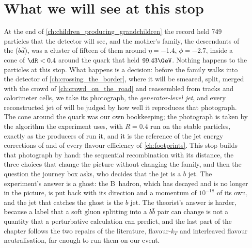 \section{What we will see at this stop}
\label{sec:family_photograph:what_we_compute}

At the end of \cref{ch:children_producing_grandchildren} the record held
749 particles that the detector will see, and the mother's family, the
descendants of the \Bbar ($b\bar d$), was a cluster of fifteen of them
around $\eta=-1.4$, $\phi=-2.7$, inside a cone of $\dR<0.4$ around the
quark that held $99.43\GeV$. Nothing happens to the particles at this
stop. What happens is a decision: before the family walks into the
detector of \cref{ch:crossing_the_border}, where it will be smeared,
split, merged with the crowd of \cref{ch:crowd_on_the_road} and
reassembled from tracks and calorimeter cells, we take its photograph,
the \emph{generator-level jet}, and every reconstructed jet of
 will be judged by how well it
reproduces that photograph. The cone around the quark was our own
bookkeeping; the photograph is taken by the algorithm the experiment
uses, \antikt with $R=0.4$ run on the stable particles, exactly as the
 producers of \CMSSW run it, and it is the reference of the
jet energy corrections of 
and of every flavour efficiency of \cref{ch:footprints}. This stop builds
that photograph by hand: the sequential recombination with its distance,
the three choices that change the picture without changing the family,
and then the question the journey box asks, who decides that the jet is
a $b$ jet. The experiment's answer is a ghost: the B~hadron, which has
decayed and is no longer in the picture, is put back with its direction
and a momentum of $10^{-18}$ of its own, and the jet that catches the
ghost is the $b$ jet. The theorist's answer is harder, because a label
that a soft gluon splitting into a $b\bar b$ pair can change is not a
quantity that a perturbative calculation can predict, and the last part
of the chapter follows the two repairs of the literature, flavour-$k_T$
and interleaved flavour neutralisation, far enough to run them on our
event.

